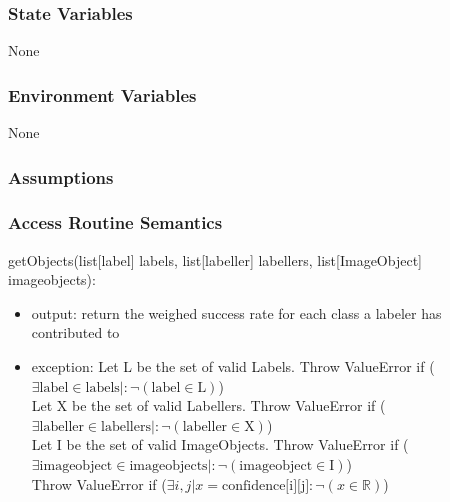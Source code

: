 \documentclass[12pt, titlepage]{article}
\begin{document}
  \subsubsection{State Variables}
  
 None
  
  \subsubsection{Environment Variables}
  
  None
  
  \subsubsection{Assumptions}
  
  
  \subsubsection{Access Routine Semantics}
  
  \noindent getObjects(list[label] labels, list[labeller] labellers, list[ImageObject] imageobjects):
  \begin{itemize}
  \item output: return the weighed success rate for each class a labeler has contributed to
  \item exception: Let L be the set of valid Labels. Throw ValueError if ($\exists \text{label} \in \text{labels} |: \neg (\text{label} \in \text{L})$)\\
  Let X be the set of valid Labellers. Throw ValueError if ($\exists \text{labeller} \in \text{labellers} |: \neg (\text{labeller} \in \text{X})$)\\
  Let I be the set of valid ImageObjects. Throw ValueError if ($\exists \text{imageobject} \in \text{imageobjects} |: \neg (\text{imageobject} \in \text{I})$)\\
  Throw ValueError if ($\exists i,j| x = \text{confidence[i][j]} : \neg (x \in \mathbb{R})$)\\
  \end{itemize}


  
  
  
\end{document}
